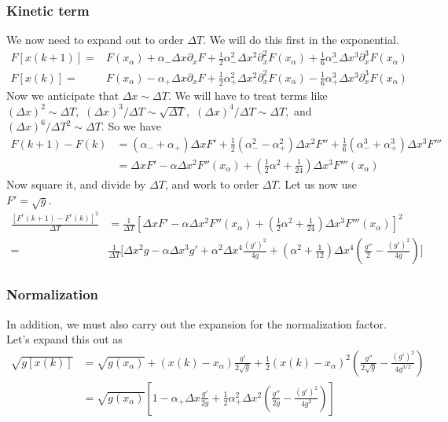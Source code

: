 \subsubsection{Kinetic term}
We now need to expand out to order $\Delta T$.  We will do this first in the exponential.  
\begin{align}
F[x(k+1)] = &F(x_\alpha) + \alpha_-\Delta x\partial_xF +\frac{1}{2}\alpha_-^2\Delta x^2\partial_x^2F(x_\alpha) +\frac{1}{6}\alpha_-^3\Delta x^3\partial_x^3F(x_\alpha) \\
F[x(k)] = &F(x_\alpha) - \alpha_+\Delta x\partial_xF +\frac{1}{2}\alpha_+^2\Delta x^2\partial_x^2 F(x_\alpha) -\frac{1}{6}\alpha_+^3\Delta x^3\partial_x^3 F(x_\alpha)
\end{align}
Now we anticipate that $\Delta x\sim\Delta T$.  We will have to treat terms like $(\Delta x)^2\sim \Delta T,$ $(\Delta x)^3/\Delta T\sim \sqrt{\Delta T},$ $(\Delta x)^4/\Delta T\sim \Delta T,$ and $(\Delta x)^6/\Delta T^2\sim \Delta T$.  
So we have 
\begin{align}
F(k+1)-F(k)&  = (\alpha_-+\alpha_+)\Delta x F' +\frac{1}{2}(\alpha_-^2-\alpha_+^2)\Delta x^2 F'' +\frac{1}{6}(\alpha_-^3+\alpha_+^3)\Delta x^3 F''' \\
&  = \Delta xF' -\alpha\Delta x^2F''(x_\alpha) +\left(\frac{1}{2}\alpha^2 + \frac{1}{24}\right)\Delta x^3  F'''(x_\alpha) 
\end{align}
Now square it, and divide by $\Delta T$, and work to order $\Delta T$.  Let us now use $F' = \sqrt{g}$.  
\begin{align}
\frac{[F^r(k+1)-F^r(k)]^2}{\Delta T} & = \frac{1}{\Delta T}\left[\Delta xF' -\alpha\Delta x^2F''(x_\alpha) +\left(\frac{1}{2}\alpha^2 + \frac{1}{24}\right)\Delta x^3  F'''(x_\alpha) \right]^2\\
 =& \frac{1}{\Delta T}\bigg[\Delta x^2 g -\alpha\Delta x^3g' + \alpha^2\Delta x^4\frac{(g')^2}{4g} +\left(\alpha^2 + \frac{1}{12}\right)\Delta x^4\left(\frac{g''}{2}  - \frac{(g')^2}{4g}\right)\bigg]
\end{align}


\subsubsection{Normalization}
In addition, we must also carry out the expansion for the normalization factor.  Let's expand this out as 
\begin{align}
\sqrt{g[x(k)]} & = \sqrt{g(x_\alpha)} + (x(k)-x_\alpha)\frac{g'}{2\sqrt{g}} + \frac{1}{2}(x(k)-x_\alpha)^2\left(\frac{g''}{2\sqrt{g}} - \frac{(g')^2}{4 g^{3/2}}\right)\\
& = \sqrt{g(x_\alpha)}\left[1 -\alpha_+\Delta x\frac{g'}{2g} + \frac{1}{2}\alpha_+^2\Delta x^2\left(\frac{g''}{2g} - \frac{(g')^2}{4 g^{2}}\right)\right]
\end{align}

